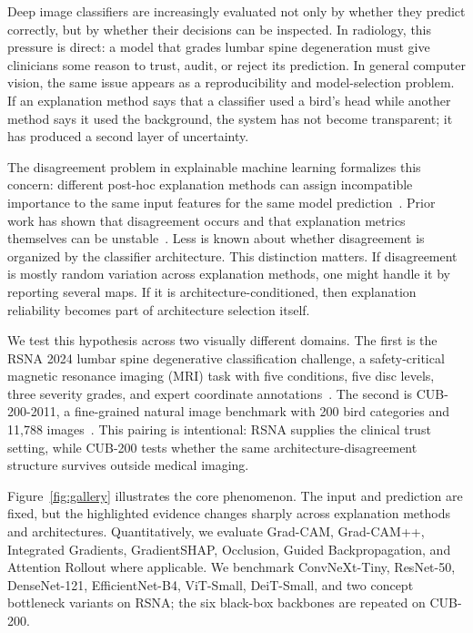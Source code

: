 \documentclass{bmvc2k}
\begin{document}
Deep image classifiers are increasingly evaluated not only by whether they predict correctly, but by whether their decisions can be inspected. In radiology, this pressure is direct: a model that grades lumbar spine degeneration must give clinicians some reason to trust, audit, or reject its prediction. In general computer vision, the same issue appears as a reproducibility and model-selection problem. If an explanation method says that a classifier used a bird's head while another method says it used the background, the system has not become transparent; it has produced a second layer of uncertainty.

The disagreement problem in explainable machine learning formalizes this concern: different post-hoc explanation methods can assign incompatible importance to the same input features for the same model prediction~\cite{krishna2022disagreement}. Prior work has shown that disagreement occurs and that explanation metrics themselves can be unstable~\cite{hedstrom2024latec,adebayo2018sanity}. Less is known about whether disagreement is organized by the classifier architecture. This distinction matters. If disagreement is mostly random variation across explanation methods, one might handle it by reporting several maps. If it is architecture-conditioned, then explanation reliability becomes part of architecture selection itself.

We test this hypothesis across two visually different domains. The first is the RSNA 2024 lumbar spine degenerative classification challenge, a safety-critical magnetic resonance imaging (MRI) task with five conditions, five disc levels, three severity grades, and expert coordinate annotations~\cite{rsna2024lumbar}. The second is CUB-200-2011, a fine-grained natural image benchmark with 200 bird categories and 11,788 images~\cite{wah2011cub}. This pairing is intentional: RSNA supplies the clinical trust setting, while CUB-200 tests whether the same architecture-disagreement structure survives outside medical imaging.

Figure~\ref{fig:gallery} illustrates the core phenomenon. The input and prediction are fixed, but the highlighted evidence changes sharply across explanation methods and architectures. Quantitatively, we evaluate Grad-CAM, Grad-CAM++, Integrated Gradients, GradientSHAP, Occlusion, Guided Backpropagation, and Attention Rollout where applicable. We benchmark ConvNeXt-Tiny, ResNet-50, DenseNet-121, EfficientNet-B4, ViT-Small, DeiT-Small, and two concept bottleneck variants on RSNA; the six black-box backbones are repeated on CUB-200.
\end{document}
